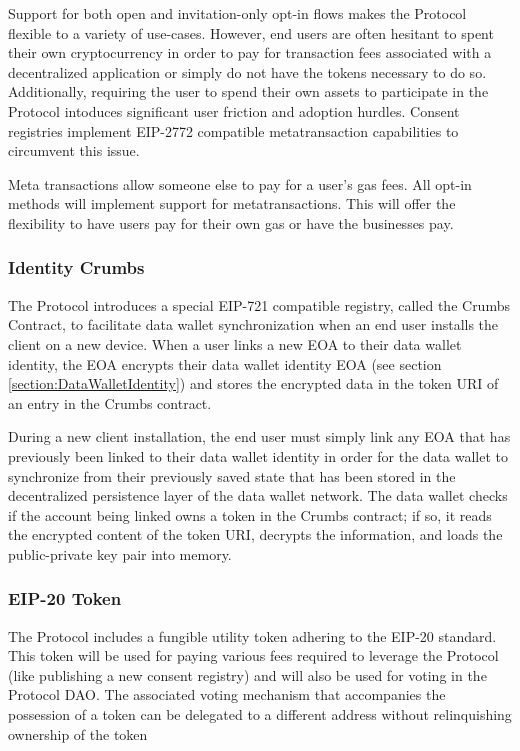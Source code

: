 Support for both open and invitation-only opt-in flows makes the Protocol flexible to a variety of use-cases. However, end users are often hesitant to 
spent their own cryptocurrency in order to pay for transaction fees associated with a decentralized application or simply do not have the tokens 
necessary to do so. Additionally, requiring the user to spend their own assets to participate in the Protocol intoduces significant user friction and
adoption hurdles. Consent registries implement EIP-2772 compatible metatransaction capabilities to circumvent this issue. 

Meta transactions allow someone else to pay for a user's gas fees. All opt-in methods will implement support for metatransactions. This will offer the 
flexibility to have users pay for their own gas or have the businesses pay.  

\subsubsection{Identity Crumbs}
\label{section:Crumbs}

The Protocol introduces a special EIP-721 compatible registry, called the Crumbs Contract, to facilitate data wallet synchronization when an end user 
installs the client on a new device. When a user links a new EOA to their data wallet identity, the EOA encrypts their data wallet identity EOA (see section
\ref{section:DataWalletIdentity}) and stores the encrypted data in the token URI of an entry in the Crumbs contract. 

During a new client installation, the end user must simply link any EOA that has previously been linked to their data wallet identity in order for the data 
wallet to synchronize from their previously saved state that has been stored in the decentralized persistence layer of the data wallet network. The data wallet
checks if the account being linked owns a token in the Crumbs contract; if so, it reads the encrypted content of the token URI, decrypts the information, and loads 
the public-private key pair into memory. 

\subsubsection{EIP-20 Token}
\label{section:Token}
The Protocol includes a fungible utility token adhering to the EIP-20 standard. This token will be used for paying various fees required to leverage
the Protocol (like publishing a new consent registry) and will also be used for voting in the Protocol DAO. The associated voting mechanism that 
accompanies the possession of a token can be delegated to a different address without relinquishing ownership of the token

